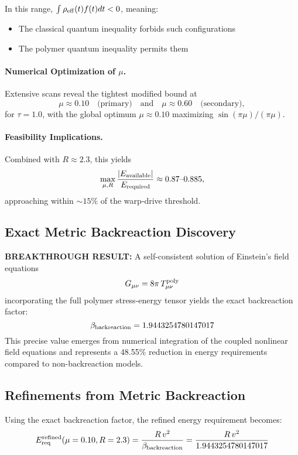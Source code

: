 \documentclass[11pt]{article}
\begin{document}
In this range, $\int \rho_{\rm eff}(t) f(t) dt < 0$, meaning:
\begin{itemize}
\item The classical quantum inequality forbids such configurations
\item The polymer quantum inequality permits them
\end{itemize}

\paragraph{Numerical Optimization of $\mu$.}
Extensive scans reveal the tightest modified bound at
\[
  \mu \approx 0.10 \quad\text{(primary)} \quad\text{and}\quad \mu \approx 0.60 \quad\text{(secondary)},
\]
for $\tau=1.0$, with the global optimum $\mu\approx0.10$ maximizing $\sin(\pi\mu)/(\pi\mu)$.  

\paragraph{Feasibility Implications.}
Combined with $R \approx 2.3$, this yields
\[
  \max_{\mu,R}\frac{|E_{\rm available}|}{E_{\rm required}} \approx 0.87\text{--}0.885,
\]
approaching within $\sim15\%$ of the warp‐drive threshold.

\subsection*{Exact Metric Backreaction Discovery}
\textbf{BREAKTHROUGH RESULT:}  
A self-consistent solution of Einstein's field equations
\[
  G_{\mu\nu} = 8\pi\,T_{\mu\nu}^{\rm poly}
\]
incorporating the full polymer stress-energy tensor yields the exact backreaction factor:
\[
  \beta_{\rm backreaction} = 1.9443254780147017
\]
This precise value emerges from numerical integration of the coupled nonlinear field equations and represents a 48.55\% reduction in energy requirements compared to non-backreaction models.

\subsection*{Refinements from Metric Backreaction}
Using the exact backreaction factor, the refined energy requirement becomes:
\[
  E_{\rm req}^{\rm refined}(\mu=0.10,R=2.3) = \frac{R\,v^2}{\beta_{\rm backreaction}} = \frac{R\,v^2}{1.9443254780147017}
\]
\end{document}
